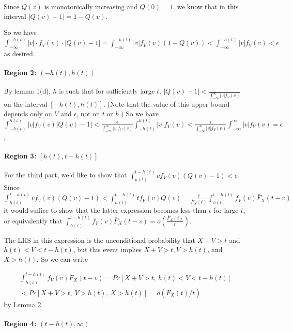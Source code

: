 \documentclass[../main.tex]{subfiles}
\begin{document}
Since \(Q(v)\) is monotonically increasing and \(Q(0)=1\), we know that in this interval \(|Q(v)-1| = 1-Q(v)\).

So we have \(\int_{-\infty}^{-h(t)}|v|\cdot f_V(v) \cdot |Q(v)-1| = \int_{-\infty}^{-h(t)}|v|f_V(v)(1-Q(v)) < \int_{-\infty}^{-h(t)}|v|f_V(v) < \epsilon\) as desired.

\paragraph{Region 2: \texorpdfstring{\((-h(t),h(t))\)}{}}
 By lemma 1(d), \(h\) is such that for sufficiently large \(t\), \(|Q(v)-1|<\frac\epsilon{\int_{-\infty}^\infty |v|f_V(v)}\) on the interval \([-h(t),h(t)]\). (Note that the value of this upper bound depends only on \(V\) and \(\epsilon\), not on \(t\) or \(h\).) So we have \(\int_{-h(t)}^{h(t)}|v|f_V(v)|Q(v)-1| < \frac{\epsilon}{\int_{-\infty}^\infty|v|f_V(v)}\int_{-h(t)}^{h(t)}|v|f_V(v) < \frac{\epsilon}{\int_{-\infty}^\infty|v|f_V(v)}\int_{-\infty}^\infty|v|f_V(v) = \epsilon\).

\paragraph{Region 3: \texorpdfstring{\([h(t),t-h(t)]\)}{}}
 For the third part, we'd like to show that \(\int_{h(t)}^{t-h(t)}vf_V(v)(Q(v)-1)<\epsilon\). Since \(\int_{h(t)}^{t-h(t)}vf_V(v)(Q(v)-1) < \int_{h(t)}^{t-h(t)}tf_V(v)Q(v) = \frac t{\bar F_X(t)}\int_{h(t)}^{t-h(t)}f_V(v)\bar F_X(t-v)\) it would suffice to show that the latter expression becomes less than \(\epsilon\) for large \(t\), or equivalently that \(\int_{h(t)}^{t-h(t)}f_V(v)\bar F_X(t-v) = o\left(\frac{\bar F_X(t)}{t}\right)\).

The LHS in this expression is the unconditional probability that \(X+V>t\) and \(h(t)<V<t-h(t)\), but this event implies \(X+V>t, V>h(t)\), and \(X>h(t)\). So we can write

\begin{multline*}
\int_{h(t)}^{t-h(t)}f_V(v)\bar F_X(t-v) = Pr[X+V>t,\ h(t) < V < t - h(t)]
\\ < Pr[X+V>t,\ V > h(t),\ X > h(t)] = o(\bar F_X(t)/t)
\end{multline*}
by Lemma 2.

\paragraph{Region 4: \texorpdfstring{\((t-h(t),\infty)\)}{}}
\end{document}
